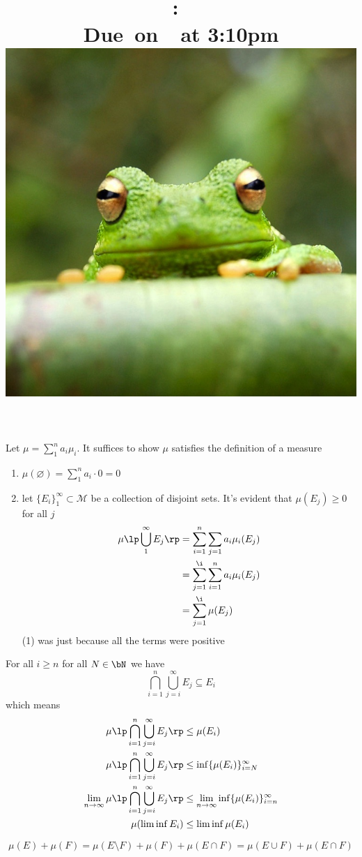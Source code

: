 \documentclass{pset}
\title{
    \vspace{2in}
    \textmd{\textbf{\hmwkClass:\ \hmwkTitle}}\\
    \normalsize\vspace{0.1in}\small{Due\ on\ \hmwkDueDate\ at 3:10pm}\\
    \includegraphics[scale=0.2]{frog} \\
    \vspace{0.1in}\large{\textit{\hmwkClassTime}}
    \vspace{3in}
}
\author{\hmwkAuthorName}
\date{}
\begin{document}
\maketitle

\pagebreak 

\begin{problem}[7]
    Let $\mu=\sum_1^na_i\mu_i$. It suffices to show $\mu$ satisfies the definition of a measure
    \begin{enumerate}
        \item \(
        \mu(\varnothing)=\sum_1^na_i\cdot 0=0
        \)
        \item let $\{E_i\}_1^\infty\subset\mathcal{M}$ be a collection of disjoint sets. It's evident that $\mu(E_j)\geq 0$ for all $j$
        \begin{align}
            \mu\lp\bigcup_1^\infty E_j\rp &= \sum_{i=1}^n\sum_{j=1}a_i\mu_i(E_j) \nonumber \\
            &=\sum_{j=1}^\i\sum_{i=1}^na_i\mu_i(E_j) \\
            &=\sum_{j=1}^\i\mu(E_j) \nonumber
        \end{align}
        (1) was just because all the terms were positive
    \end{enumerate}
\end{problem}
\begin{problem}
    For all $i\geq n$ for all $N\in \bN$ we have
    $$
    \bigcap_{i=1}^n\bigcup_{j=i}^\infty E_j\subseteq E_i
    $$
    which means
    \begin{align*}
        \mu\lp\bigcap_{i=1}^n\bigcup_{j=i}^\infty E_j\rp&\leq \mu(E_i) \\
        \mu\lp\bigcap_{i=1}^n\bigcup_{j=i}^\infty E_j\rp&\leq \inf\{\mu(E_i)\}_{i=N}^\infty \\
        \lim_{n\to\infty}\mu\lp\bigcap_{i=1}^n\bigcup_{j=i}^\infty E_j\rp&\leq\lim_{n\to\infty}\inf\{\mu(E_i)\}_{i=n}^\infty \\
        \mu(\liminf E_i)&\leq \liminf\mu(E_i)
    \end{align*}
\end{problem}
\begin{problem}
    $$
    \mu(E)+\mu(F)=\mu(E\setminus F)+\mu(F)+\mu(E\cap F)=\mu(E\cup F)+\mu(E\cap F)
    $$
\end{problem}
\end{document}
